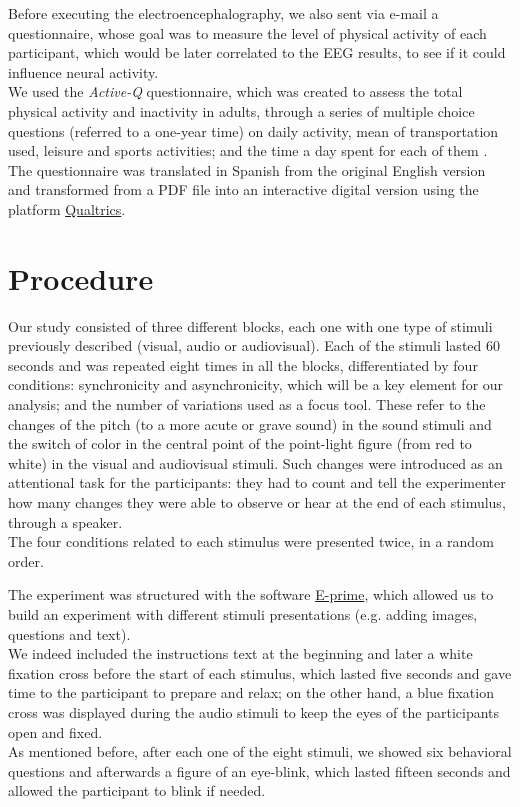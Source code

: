 Before executing the electroencephalography, we also sent via e-mail a questionnaire, whose goal was to measure the level of physical activity of each participant, which would be later correlated to the EEG results, to see if it could influence neural activity. \\
We used the \textit{Active-Q} questionnaire, which was created to assess the total physical activity and inactivity in adults, through a series of multiple choice questions (referred to a one-year time) on daily activity, mean of transportation used, leisure and sports activities; and the time a day spent for each of them \parencite{Bonn_2012}. 
The questionnaire was translated in Spanish from the original English version and transformed from a PDF file into an interactive digital version using the platform \href{https://www.qualtrics.com/uk/?rid=ip&prevsite=en&newsite=uk&geo=ES&geomatch=uk}{Qualtrics}. 

\section{Procedure}
Our study consisted of three different blocks, each one with one type of stimuli previously described (visual, audio or audiovisual). 
Each of the stimuli lasted 60 seconds and was repeated eight times in all the blocks, differentiated by four conditions: synchronicity and asynchronicity, which will be a key element for our analysis; and the number of variations used as a focus tool. These refer to the changes of the pitch (to a more acute or grave sound) in the sound stimuli and the switch of color  in the central point of the point-light figure (from red to white) in the visual and audiovisual stimuli. Such changes were introduced as an attentional task for the participants: they had to count and tell the experimenter how many changes they were able to observe or hear at the end of each stimulus, through a speaker. \\
The four conditions related to each stimulus were presented twice, in a random order. 

The experiment was structured with the software \href{https://pstnet.com/products/e-prime/}{E-prime}, which allowed us to build an experiment with different stimuli presentations (e.g. adding images, questions and text). \\
We indeed included the instructions text at the beginning and later a white fixation cross before the start of each stimulus, which lasted five seconds and gave time to the participant to prepare and relax; on the other hand, a blue fixation cross was displayed during the audio stimuli to keep the eyes of the participants open and fixed. \\
As mentioned before, after each one of the eight stimuli, we showed six behavioral questions and afterwards a figure of an eye-blink, which lasted fifteen seconds and allowed the participant to blink if needed.

